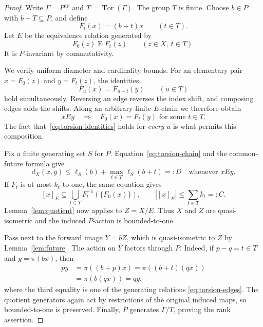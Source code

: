 \documentclass[10pt,a4paper]{amsart}
\DeclareMathOperator{\Tor}{Tor}
\newcommand{\gp}{\mathrm{gp}}
\begin{document}
\begin{proof}
Write $\Gamma=P^{\gp}$ and $T=\Tor(\Gamma)$. The group $T$ is finite.
Choose $b\in P$ with $b+T\subseteq P$, and define
\[
 F_t(x)=(b+t)x\qquad(t\in T).
\]
Let $E$ be the equivalence relation generated by
\begin{equation}\label{eq:torsion-edges}
 F_0(z)\mathrel E F_t(z)\qquad(z\in X,\ t\in T).
\end{equation}
It is $P$-invariant by commutativity.

We verify uniform diameter and cardinality bounds. For an elementary pair
$x=F_0(z)$ and $y=F_t(z)$, the identities
\begin{equation}\label{eq:torsion-identities}
 F_u(x)=F_{u-t}(y)\qquad(u\in T)
\end{equation}
hold simultaneously. Reversing an edge reverses the index shift, and
composing edges adds the shifts. Along an arbitrary finite $E$-chain we
therefore obtain
\begin{equation}\label{eq:torsion-chain}
 xEy\quad\Longrightarrow\quad F_0(x)=F_t(y)
 \text{ for some }t\in T.
\end{equation}
The fact that~\eqref{eq:torsion-identities} holds for \emph{every} $u$ is
what permits this composition.

Fix a finite generating set $S$ for $P$. Equation~\eqref{eq:torsion-chain}
and the common-future formula give
\[
 d_X(x,y)\le \ell_S(b)+\max_{t\in T}\ell_S(b+t)=:D
 \quad\text{whenever }xEy.
\]
If $F_t$ is at most $k_t$-to-one, the same equation gives
\[
 [x]_E\subseteq\bigcup_{t\in T}F_t^{-1}(\{F_0(x)\}),
 \qquad |[x]_E|\le\sum_{t\in T}k_t=:C.
\]
Lemma~\ref{lem:quotient} now applies to $Z=X/E$. Thus $X$ and $Z$ are
quasi-isometric and the induced $P$-action is bounded-to-one.

Pass next to the forward image $Y=bZ$, which is quasi-isometric to $Z$ by
Lemma~\ref{lem:future}. The action on $Y$ factors through $\overline P$.
Indeed, if $p-q=t\in T$ and $y=\pi(bx)$, then
\[
 \begin{aligned}
 py&=\pi((b+p)x)
     =\pi((b+t)(qx))\\
   &=\pi(b(qx))=qy,
 \end{aligned}
\]
where the third equality is one of the generating relations
\eqref{eq:torsion-edges}. The quotient generators again act by restrictions
of the original induced maps, so bounded-to-one is preserved. Finally,
$\overline P$ generates $\Gamma/T$, proving the rank assertion.
\end{proof}
\end{document}
